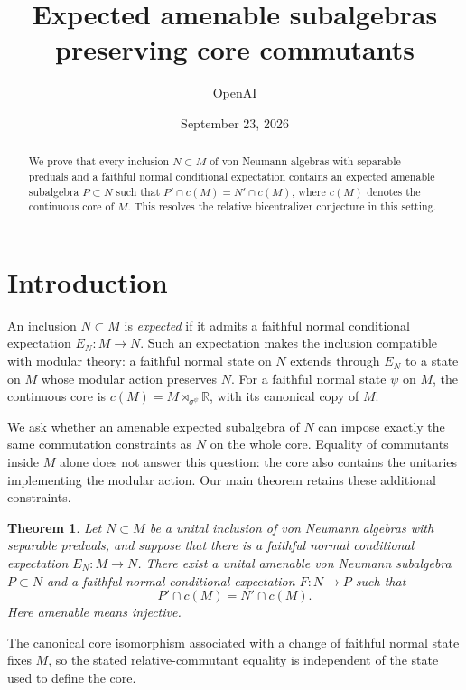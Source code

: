 \documentclass[11pt]{article}
\title{Expected amenable subalgebras\\preserving core commutants}
\author{OpenAI}
\date{September 23, 2026}
\newtheorem{theorem}{Theorem}[section]
\theoremstyle{definition}
\newcommand{\R}{\mathbb R}
\begin{document}
\maketitle
\begin{abstract}
We prove that every inclusion $N\subset M$ of von Neumann algebras with
separable preduals and a faithful normal conditional expectation contains
an expected amenable subalgebra $P\subset N$ such that
$P'\cap c(M)=N'\cap c(M)$, where $c(M)$ denotes the continuous core of $M$.
This resolves the relative bicentralizer conjecture in this setting.
\end{abstract}

\section{Introduction}
An inclusion $N\subset M$ is \emph{expected} if it admits a faithful normal
conditional expectation $E_N:M\to N$. Such an expectation makes the
inclusion compatible with modular theory: a faithful normal state on $N$
extends through $E_N$ to a state on $M$ whose modular action preserves $N$.
For a faithful normal state $\psi$ on $M$, the continuous core is
$c(M)=M\rtimes_{\sigma^\psi}\R$, with its canonical copy of $M$.

We ask whether an amenable expected subalgebra of $N$ can impose exactly
the same commutation constraints as $N$ on the whole core. Equality of
commutants inside $M$ alone does not answer this question: the core also
contains the unitaries implementing the modular action. Our main theorem
retains these additional constraints.

\begin{theorem}\label{thm:main}
Let $N\subset M$ be a unital inclusion of von Neumann algebras with separable
preduals, and suppose that there is a faithful normal conditional expectation
$E_N:M\to N$. There exist a unital amenable von Neumann subalgebra $P\subset N$
and a faithful normal conditional expectation $F:N\to P$ such that
\[
 P'\cap c(M)=N'\cap c(M).
\]
Here amenable means injective.
\end{theorem}
The canonical core isomorphism associated with a change of faithful normal
state fixes $M$, so the stated relative-commutant equality is independent
of the state used to define the core.
\end{document}
